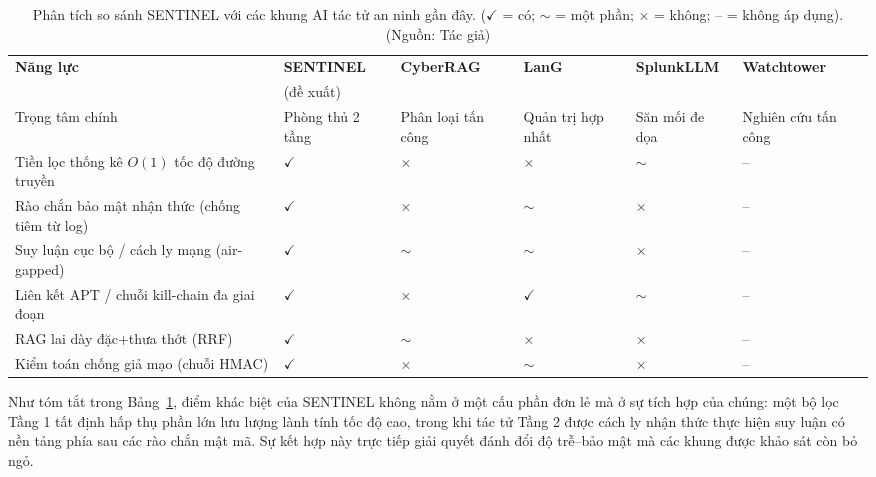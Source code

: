 \begin{table}[!htbp]
    \centering
    \footnotesize
    \setlength{\tabcolsep}{4pt}
    \renewcommand{\arraystretch}{1.25}
    \caption{Phân tích so sánh SENTINEL với các khung AI tác tử an ninh gần đây. ($\checkmark$ = có; $\sim$ = một phần; $\times$ = không; -- = không áp dụng). (Nguồn: Tác giả)}
    \label{tab:related_work}
    \begin{tabular}{|>{\raggedright\arraybackslash}p{}|*{5}{>{\centering\arraybackslash}p{}|}}
        \hline
        \textbf{Năng lực} & \textbf{SENTINEL} & \textbf{Cyber\-RAG} & \textbf{LanG} & \textbf{Splunk\-LLM} & \textbf{Watch\-tower} \\
         & (đề xuất) & \cite{cyberrag2025} & \cite{lang2026} & \cite{splunkllm2026} & \cite{watchtower2026} \\
        \hline
        Trọng tâm chính & Phòng thủ 2 tầng & Phân loại tấn công & Quản trị hợp nhất & Săn mối đe dọa & Nghiên cứu tấn công \\
        \hline
        Tiền lọc thống kê $O(1)$ tốc độ đường truyền & $\checkmark$ & $\times$ & $\times$ & $\sim$ & -- \\
        \hline
        Rào chắn bảo mật nhận thức (chống tiêm từ log) & $\checkmark$ & $\times$ & $\sim$ & $\times$ & -- \\
        \hline
        Suy luận cục bộ / cách ly mạng (air-gapped) & $\checkmark$ & $\sim$ & $\sim$ & $\times$ & -- \\
        \hline
        Liên kết APT / chuỗi kill-chain đa giai đoạn & $\checkmark$ & $\times$ & $\checkmark$ & $\sim$ & -- \\
        \hline
        RAG lai dày đặc+thưa thớt (RRF) & $\checkmark$ & $\sim$ & $\times$ & $\times$ & -- \\
        \hline
        Kiểm toán chống giả mạo (chuỗi HMAC) & $\checkmark$ & $\times$ & $\sim$ & $\times$ & -- \\
        \hline
    \end{tabular}
\end{table}

Như tóm tắt trong Bảng~\ref{tab:related_work}, điểm khác biệt của SENTINEL không nằm ở một cấu phần đơn lẻ mà ở sự tích hợp của chúng: một bộ lọc Tầng 1 tất định hấp thụ phần lớn lưu lượng lành tính tốc độ cao, trong khi tác tử Tầng 2 được cách ly nhận thức thực hiện suy luận có nền tảng phía sau các rào chắn mật mã. Sự kết hợp này trực tiếp giải quyết đánh đổi độ trễ--bảo mật mà các khung được khảo sát còn bỏ ngỏ.

